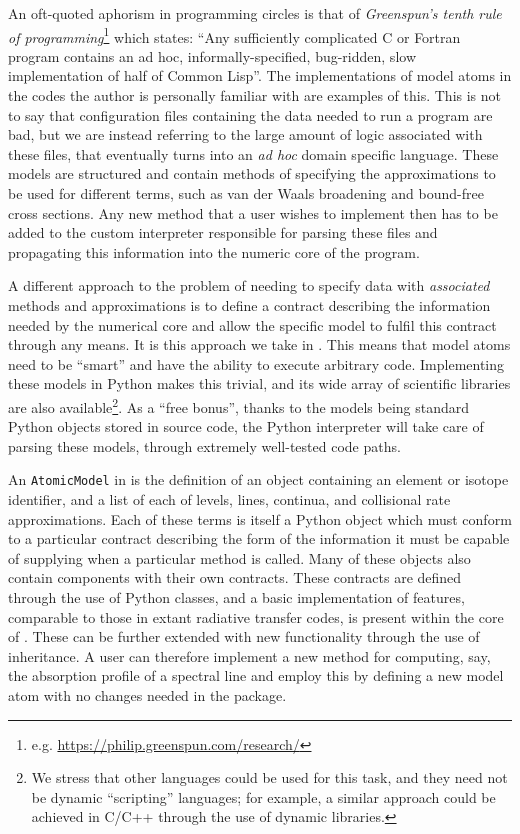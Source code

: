 An oft-quoted aphorism in programming circles is that of \emph{Greenspun's tenth rule of programming}\footnote{e.g. \url{https://philip.greenspun.com/research/}} which states: ``Any sufficiently complicated C or Fortran program contains an ad hoc, informally-specified, bug-ridden, slow implementation of half of Common Lisp''.
The implementations of model atoms in the codes the author is personally familiar with are examples of this.
This is not to say that configuration files containing the data needed to run a program are bad, but we are instead referring to the large amount of logic associated with these files, that eventually turns into an \emph{ad hoc} domain specific language.
These models are structured and contain methods of specifying the approximations to be used for different terms, such as van der Waals broadening and bound-free cross sections.
Any new method that a user wishes to implement then has to be added to the custom interpreter responsible for parsing these files and propagating this information into the numeric core of the program.

A different approach to the problem of needing to specify data with \emph{associated} methods and approximations is to define a contract describing the information needed by the numerical core and allow the specific model to fulfil this contract through any means.
It is this approach we take in \Lw{}.
This means that model atoms need to be ``smart'' and have the ability to execute arbitrary code.
Implementing these models in Python makes this trivial, and its wide array of scientific libraries are also available\footnote{We stress that other languages could be used for this task, and they need not be dynamic ``scripting'' languages; for example, a similar approach could be achieved in C/C++ through the use of dynamic libraries.}.
As a ``free bonus'', thanks to the models being standard Python objects stored in source code, the Python interpreter will take care of parsing these models, through extremely well-tested code paths.

An \texttt{AtomicModel} in \Lw{} is the definition of an object containing an element or isotope identifier, and a list of each of levels, lines, continua, and collisional rate approximations.
Each of these terms is itself a Python object which must conform to a particular contract describing the form of the information it must be capable of supplying when a particular method is called.
Many of these objects also contain components with their own contracts.
These contracts are defined through the use of Python classes, and a basic implementation of features, comparable to those in extant radiative transfer codes, is present within the core of  \Lw{}.
These can be further extended with new functionality through the use of inheritance.
A user can therefore implement a new method for computing, say, the absorption profile \citep[e.g. the non-Voigt profile of][]{Kowalski2017} of a spectral line and employ this by defining a new model atom with no changes needed in the \Lw{} package.

